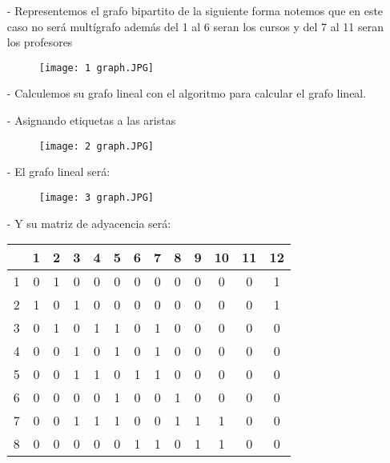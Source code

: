 \documentclass[letterpaper,12pt]{article}
\begin{document}
\begin{itemize}
        \item[-]Representemos el grafo bipartito de la siguiente forma notemos que en este caso no será multígrafo además del 1 al 6 seran los cursos y del 7 al 11 seran los profesores
        \begin{figure} [h]
            \centering
            \texttt{[image: 1 graph.JPG]}
            \label{fig:my_label}
        \end{figure}
        \item[-] Calculemos su grafo lineal con el algoritmo para calcular el grafo lineal.
        \item[-] Asignando etiquetas a las aristas \\
        \begin{figure} [h]
            \centering
            \texttt{[image: 2 graph.JPG]}
            \label{fig:my_label}
        \end{figure}
        \item[-] El grafo lineal será: \\
        \begin{figure} [h]
            \centering
            \texttt{[image: 3 graph.JPG]}
            \label{fig:my_label}
        \end{figure}
        \item[-] Y su matriz de adyacencia será:
        \begin{center}
        \begin{tabular}{|c|c|c|c|c|c|c|c|c|c|c|c|c|}
        \hline
         & 1 & 2 & 3 & 4 & 5 & 6 & 7 & 8 & 9 & 10 & 11 & 12 \\
        \hline
        1 & 0 & 1 & 0 & 0 & 0 & 0 & 0 & 0 & 0 & 0 & 0 & 1 \\
        \hline
        2 & 1 & 0 & 1 & 0 & 0 & 0 & 0 & 0 & 0 & 0 & 0 & 1 \\
        \hline 
        3 & 0 & 1 & 0 & 1 & 1 & 0 & 1 & 0 & 0 & 0 & 0 & 0 \\
        \hline 
        4 & 0 & 0 & 1 & 0 & 1 & 0 & 1 & 0 & 0 & 0 & 0 & 0 \\
        \hline
        5 & 0 & 0 & 1 & 1 & 0 & 1 & 1 & 0 & 0 & 0 & 0 & 0 \\
        \hline
        6 & 0 & 0 & 0 & 0 & 1 & 0 & 0 & 1 & 0 & 0 & 0 & 0 \\
        \hline
        7 & 0 & 0 & 1 & 1 & 1 & 0 & 0 & 1 & 1 & 1 & 0 & 0 \\
        \hline
        8 & 0 & 0 & 0 & 0 & 0 & 1 & 1 & 0 & 1 & 1 & 0 & 0 \\

\end{tabular}
\end{center}
\end{itemize}
\end{document}
